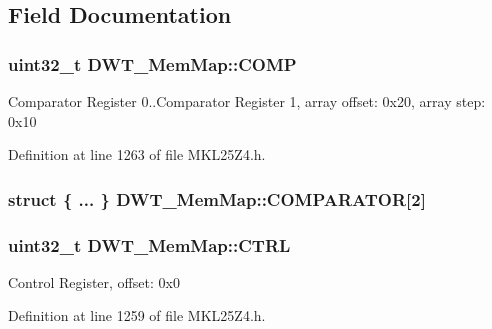 \subsection{Field Documentation}
\subsubsection[{\texorpdfstring{C\+O\+MP}{COMP}}]{\setlength{\rightskip}{0pt plus 5cm}uint32\+\_\+t D\+W\+T\+\_\+\+Mem\+Map\+::\+C\+O\+MP}\hypertarget{struct_d_w_t___mem_map_ae10b19c1d610d27a71a1dc34a84a0e60}{}\label{struct_d_w_t___mem_map_ae10b19c1d610d27a71a1dc34a84a0e60}
Comparator Register 0..Comparator Register 1, array offset\+: 0x20, array step\+: 0x10 

Definition at line 1263 of file M\+K\+L25\+Z4.\+h.

\subsubsection[{\texorpdfstring{C\+O\+M\+P\+A\+R\+A\+T\+OR}{COMPARATOR}}]{\setlength{\rightskip}{0pt plus 5cm}struct \{ ... \}   D\+W\+T\+\_\+\+Mem\+Map\+::\+C\+O\+M\+P\+A\+R\+A\+T\+OR\mbox{[}2\mbox{]}}\hypertarget{struct_d_w_t___mem_map_a359fb3ddfe2614d916d5cbf1e90b04ea}{}\label{struct_d_w_t___mem_map_a359fb3ddfe2614d916d5cbf1e90b04ea}
\subsubsection[{\texorpdfstring{C\+T\+RL}{CTRL}}]{\setlength{\rightskip}{0pt plus 5cm}uint32\+\_\+t D\+W\+T\+\_\+\+Mem\+Map\+::\+C\+T\+RL}\hypertarget{struct_d_w_t___mem_map_ab3581abb33e428126e7ec339e66514e4}{}\label{struct_d_w_t___mem_map_ab3581abb33e428126e7ec339e66514e4}
Control Register, offset\+: 0x0 

Definition at line 1259 of file M\+K\+L25\+Z4.\+h.

